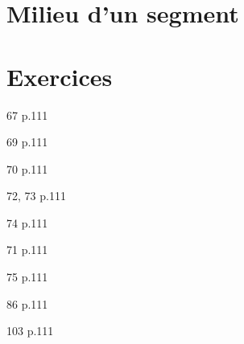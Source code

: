 \documentclass[10pt,a4paper,openany,twoside, prof]{book}
\begin{document}
\section{Milieu d'un segment}


\newpage
\section*{Exercices}
\begin{exercices}
	\begin{bookexo}{67 p.111}\end{bookexo}
	\begin{bookexo}{69 p.111}\end{bookexo}
	\begin{bookexo}{70 p.111}\end{bookexo}
	\begin{bookexos}{72, 73 p.111}\end{bookexos}
	\begin{bookexos}{74 p.111}\end{bookexos}
	\begin{bookexo}{71 p.111}\end{bookexo}
	\begin{bookexo}{75 p.111}\end{bookexo}
	\begin{bookexo}[\diff]{86 p.111}\end{bookexo}
	\begin{bookexo}[\diff\diff]{103 p.111}\end{bookexo}

\end{exercices}
\end{document}
